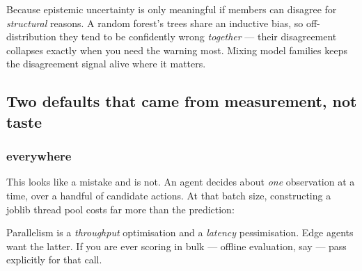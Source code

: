 \begin{keybox}
Because epistemic uncertainty is only meaningful if members can disagree for
\emph{structural} reasons. A random forest's trees share an inductive bias, so
off-distribution they tend to be confidently wrong \emph{together} --- their
disagreement collapses exactly when you need the warning most. Mixing model
families keeps the disagreement signal alive where it matters.
\end{keybox}

\subsection{Two defaults that came from measurement, not taste}

\subsubsection{ everywhere}

This looks like a mistake and is not. An agent decides about \emph{one}
observation at a time, over a handful of candidate actions. At that batch size,
constructing a joblib thread pool costs far more than the prediction:

\begin{center}
\end{center}

\noindent Parallelism is a \emph{throughput} optimisation and a \emph{latency}
pessimisation. Edge agents want the latter. If you are ever scoring in bulk
--- offline evaluation, say --- pass  explicitly for that call.

